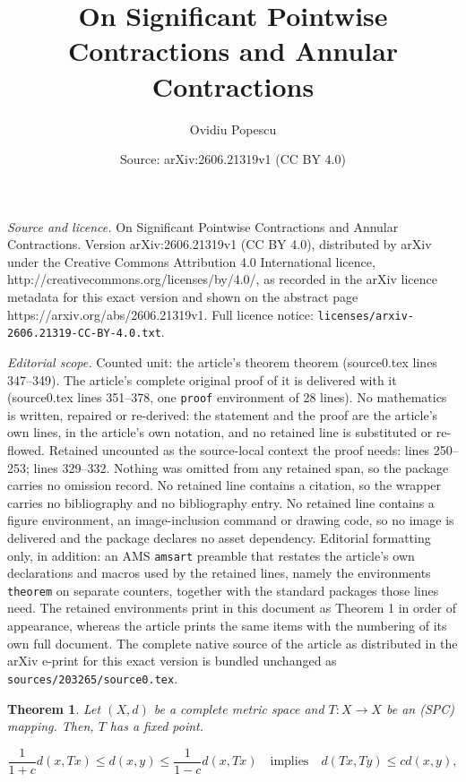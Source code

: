 \documentclass[10pt,a4paper]{amsart}
\title{On Significant Pointwise Contractions and Annular Contractions}
\author{Ovidiu Popescu}
\date{Source: arXiv:2606.21319v1 (CC BY 4.0)}
\newtheorem{theorem}{Theorem}
\begin{document}
\maketitle

\noindent\emph{Source and licence.} On Significant Pointwise Contractions and Annular Contractions. Version arXiv:2606.21319v1 (CC BY 4.0), distributed by arXiv under the Creative Commons Attribution 4.0 International licence, http://creativecommons.org/licenses/by/4.0/, as recorded in the arXiv licence metadata for this exact version and shown on the abstract page https://arxiv.org/abs/2606.21319v1. Full licence notice: \texttt{licenses/arxiv-2606.21319-CC-BY-4.0.txt}.\par\smallskip

\noindent\textit{Editorial scope.} Counted unit: the article's theorem theorem (source0.tex lines 347--349). The article's complete original proof of it is delivered with it (source0.tex lines 351--378, one \texttt{proof} environment of 28 lines). No mathematics is written, repaired or re-derived: the statement and the proof are the article's own lines, in the article's own notation, and no retained line is substituted or re-flowed.  Retained uncounted as the source-local context the proof needs: lines 250--253; lines 329--332.  Nothing was omitted from any retained span, so the package carries no omission record.  No retained line contains a citation, so the wrapper carries no bibliography and no bibliography entry.  No retained line contains a figure environment, an image-inclusion command or drawing code, so no image is delivered and the package declares no asset dependency.  Editorial formatting only, in addition: an AMS \texttt{amsart} preamble that restates the article's own declarations and macros used by the retained lines, namely the environments \texttt{theorem} on separate counters, together with the standard packages those lines need.  The retained environments print in this document as Theorem 1 in order of appearance, whereas the article prints the same items with the numbering of its own full document.  The complete native source of the article as distributed in the arXiv e-print for this exact version is bundled unchanged as \texttt{sources/203265/source0.tex}.
	\begin{theorem}
		Let \((X,d)\) be a complete metric space and \(T : X \to X \) be an (SPC) mapping. Then, \(T\) has a fixed point.
		\label{Th2.25}
	\end{theorem}

		\begin{equation}
			\dfrac{1}{1+c}d(x,Tx) \leq d(x,y)\leq \dfrac{1}{1-c}d(x,Tx) \quad \text{implies} \quad d(Tx,Ty) \leq c d(x,y), 
			\label{***}
		\end{equation}
\end{document}
